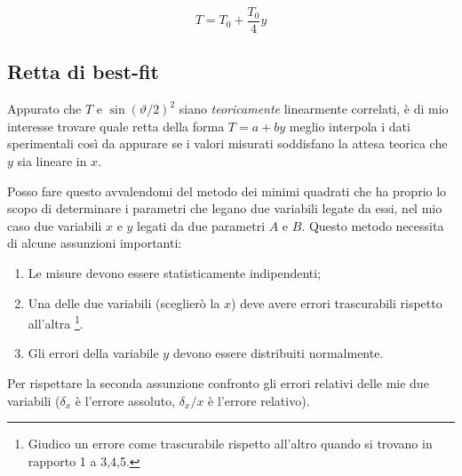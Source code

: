 \documentclass{article}
\begin{document}
	\[
	T = T_0 + \frac{T_0}{4}y
	\]

	
	\subsection{Retta di best-fit}
	Appurato che $T$ e $\sin{\left(\vartheta/2\right)}^2$ siano \textit{teoricamente} linearmente correlati, è di mio interesse trovare quale retta della forma $T = a + by$ meglio interpola i dati sperimentali così da appurare se i valori misurati soddisfano la attesa teorica che $y$ sia lineare in $x$. 
	
	Posso fare questo avvalendomi del metodo dei minimi quadrati che ha  proprio lo scopo di determinare i parametri che legano due variabili legate da essi, nel mio caso due variabili $x$ e $y$ legati da due parametri $A$ e $B$. Questo metodo necessita di alcune assunzioni importanti: 
	
	\begin{enumerate}
		\item Le misure devono essere statisticamente indipendenti;
		\item Una delle due variabili (sceglierò la $x$) deve avere errori trascurabili rispetto all'altra \footnote{Giudico un errore come trascurabile rispetto all'altro quando si trovano in rapporto 1 a 3,4,5.}.
		\item Gli errori della variabile $y$ devono essere distribuiti normalmente.
	\end{enumerate}
	
	\noindent
	Per rispettare la seconda assunzione confronto gli errori relativi delle mie due variabili ($\delta_x$ è l'errore assoluto, $\delta_x/x$ è l'errore relativo).
	
\end{document}
